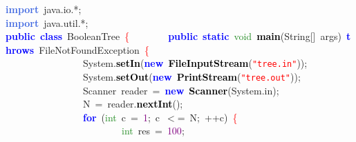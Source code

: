 
{\ttfamily \raggedright {
\noindent
\mbox{}\textbf{\textcolor{RoyalBlue}{import}}\ java\textcolor{BrickRed}{.}io\textcolor{BrickRed}{.*;} \\
\mbox{}\textbf{\textcolor{RoyalBlue}{import}}\ java\textcolor{BrickRed}{.}util\textcolor{BrickRed}{.*;} \\
\mbox{}\textbf{\textcolor{Blue}{public}}\ \textbf{\textcolor{Blue}{class}}\ BooleanTree\ \textcolor{Red}{\{}\ \ \ \ \ \ \ \ \textbf{\textcolor{Blue}{public}}\ \textbf{\textcolor{Blue}{static}}\ \textcolor{ForestGreen}{void}\ \textbf{\textcolor{Black}{main}}\textcolor{BrickRed}{(}String\textcolor{BrickRed}{[]}\ args\textcolor{BrickRed}{)}\ \textbf{\textcolor{Blue}{throws}}\ FileNotFoundException\ \textcolor{Red}{\{} \\
\mbox{}\ \ \ \ \ \ \ \ \ \ \ \ \ \ \ \ System\textcolor{BrickRed}{.}\textbf{\textcolor{Black}{setIn}}\textcolor{BrickRed}{(}\textbf{\textcolor{Blue}{new}}\ \textbf{\textcolor{Black}{FileInputStream}}\textcolor{BrickRed}{(}\texttt{\textcolor{Red}{"{}tree.in"{}}}\textcolor{BrickRed}{));} \\
\mbox{}\ \ \ \ \ \ \ \ \ \ \ \ \ \ \ \ System\textcolor{BrickRed}{.}\textbf{\textcolor{Black}{setOut}}\textcolor{BrickRed}{(}\textbf{\textcolor{Blue}{new}}\ \textbf{\textcolor{Black}{PrintStream}}\textcolor{BrickRed}{(}\texttt{\textcolor{Red}{"{}tree.out"{}}}\textcolor{BrickRed}{));} \\
\mbox{}\ \ \ \ \ \ \ \ \ \ \ \ \ \ \ \ Scanner\ reader\ \textcolor{BrickRed}{=}\ \textbf{\textcolor{Blue}{new}}\ \textbf{\textcolor{Black}{Scanner}}\textcolor{BrickRed}{(}System\textcolor{BrickRed}{.}in\textcolor{BrickRed}{);} \\
\mbox{}\ \ \ \ \ \ \ \ \ \ \ \ \ \ \ \ N\ \textcolor{BrickRed}{=}\ reader\textcolor{BrickRed}{.}\textbf{\textcolor{Black}{nextInt}}\textcolor{BrickRed}{();} \\
\mbox{}\ \ \ \ \ \ \ \ \ \ \ \ \ \ \ \ \textbf{\textcolor{Blue}{for}}\ \textcolor{BrickRed}{(}\textcolor{ForestGreen}{int}\ c\ \textcolor{BrickRed}{=}\ \textcolor{Purple}{1}\textcolor{BrickRed}{;}\ c\ \textcolor{BrickRed}{$<$=}\ N\textcolor{BrickRed}{;}\ \textcolor{BrickRed}{++}c\textcolor{BrickRed}{)}\ \textcolor{Red}{\{} \\
\mbox{}\ \ \ \ \ \ \ \ \ \ \ \ \ \ \ \ \ \ \ \ \ \ \ \ \textcolor{ForestGreen}{int}\ res\ \textcolor{BrickRed}{=}\ \textcolor{Purple}{100}\textcolor{BrickRed}{;} \\
}}

